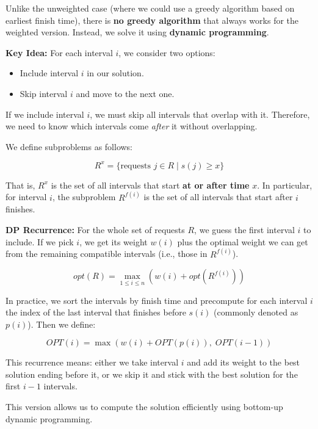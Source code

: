 \documentclass[12pt]{article}
\begin{document}
\noindent 
Unlike the unweighted case (where we could use a greedy algorithm based on earliest finish time), there is \textbf{no greedy algorithm} that always works for the weighted version. Instead, we solve it using \textbf{dynamic programming}.

\noindent 
\vspace{1em}
\textbf{Key Idea:} For each interval \(i\), we consider two options:
\begin{itemize}
    \item Include interval \(i\) in our solution.
    \item Skip interval \(i\) and move to the next one.
\end{itemize}

\noindent 
If we include interval \(i\), we must skip all intervals that overlap with it. Therefore, we need to know which intervals come \textit{after} it without overlapping.

\noindent 
\vspace{1em}
We define subproblems as follows:

\[
R^x = \{ \text{requests } j \in R \mid s(j) \geq x \}
\]

\noindent 
That is, \(R^x\) is the set of all intervals that start \textbf{at or after time} \(x\). In particular, for interval \(i\), the subproblem \(R^{f(i)}\) is the set of all intervals that start after \(i\) finishes.

\noindent 
\vspace{1em}
\textbf{DP Recurrence:} For the whole set of requests \(R\), we guess the first interval \(i\) to include. If we pick \(i\), we get its weight \(w(i)\) plus the optimal weight we can get from the remaining compatible intervals (i.e., those in \(R^{f(i)}\)).

\noindent 
\[
opt(R) = \max_{1 \leq i \leq n} \left(w(i) + opt(R^{f(i)})\right)
\]

\noindent 
In practice, we sort the intervals by finish time and precompute for each interval \(i\) the index of the last interval that finishes before \(s(i)\) (commonly denoted as \(p(i)\)). Then we define:

\noindent 
\[
OPT(i) = \max\left(w(i) + OPT(p(i)),\; OPT(i-1)\right)
\]

\noindent 
This recurrence means: either we take interval \(i\) and add its weight to the best solution ending before it, or we skip it and stick with the best solution for the first \(i-1\) intervals.

\noindent 
This version allows us to compute the solution efficiently using bottom-up dynamic programming.
\end{document}
